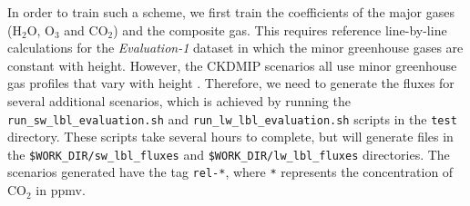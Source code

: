 \documentclass[a4,oneside]{article}
\def\codesize{\small}
\def\codesize{\small}
\def\code#1{{\codesize\texttt{#1}}}
\begin{document}
In order to train such a scheme, we first train the coefficients of
the major gases (H$_2$O, O$_3$ and CO$_2$) and the composite gas. This
requires reference line-by-line calculations for the
\emph{Evaluation-1} dataset in which the minor greenhouse gases are
constant with height.  However, the CKDMIP scenarios all use minor
greenhouse gas profiles that vary with height \citep[see Fig.\ 2
  of][]{Hogan&2020}. Therefore, we need to generate the fluxes for
several additional scenarios, which is achieved by running the
\code{run\_sw\_lbl\_evaluation.sh} and
\code{run\_lw\_lbl\_evaluation.sh} scripts in the \code{test}
directory. These scripts take several hours to complete, but will
generate files in the \code{\$WORK\_DIR/sw\_lbl\_fluxes} and
\code{\$WORK\_DIR/lw\_lbl\_fluxes} directories. The scenarios
generated have the tag \code{rel-*}, where \code{*} represents the
concentration of CO$_2$ in ppmv.
\end{document}
